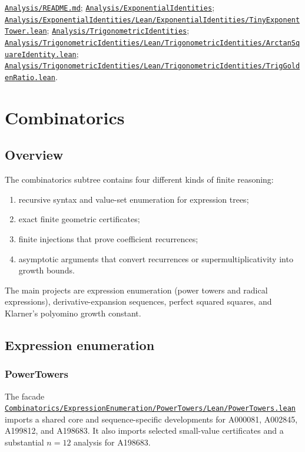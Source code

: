\documentclass[
  10pt,
  a4paper,
  twoside,
  open=any,
  parskip=half,
  headings=big
]{scrreprt}
\newcommand{\CommitFull}{675d0a2ff0fc624fba199e006049016ba806f40a}
\newcommand{\RepoBlobBase}{https://github.com/VladimirReshetnikov/ProveIt/blob/\CommitFull/}
\newcommand{\RepoTreeBase}{https://github.com/VladimirReshetnikov/ProveIt/tree/\CommitFull/}
\newcommand{\RepoFile}[1]{%
  \href{\RepoBlobBase\detokenize{#1}}{\nolinkurl{#1}}}
\newcommand{\RepoDir}[1]{%
  \href{\RepoTreeBase\detokenize{#1}}{\nolinkurl{#1}}}
\begin{document}
\begin{sourcebox}
\RepoFile{Analysis/README.md};
\RepoDir{Analysis/ExponentialIdentities};
\RepoFile{Analysis/ExponentialIdentities/Lean/ExponentialIdentities/TinyExponentTower.lean};
\RepoDir{Analysis/TrigonometricIdentities};
\RepoFile{Analysis/TrigonometricIdentities/Lean/TrigonometricIdentities/ArctanSquareIdentity.lean};
\RepoFile{Analysis/TrigonometricIdentities/Lean/TrigonometricIdentities/TrigGoldenRatio.lean}.
\end{sourcebox}

\chapter{Combinatorics}
\label{chap:combinatorics}

\section{Overview}

The combinatorics subtree contains four different kinds of finite reasoning:

\begin{enumerate}
  \item recursive syntax and value-set enumeration for expression trees;
  \item exact finite geometric certificates;
  \item finite injections that prove coefficient recurrences;
  \item asymptotic arguments that convert recurrences or
        supermultiplicativity into growth bounds.
\end{enumerate}

The main projects are expression enumeration (power towers and radical
expressions), derivative-expansion sequences, perfect squared squares, and
Klarner's polyomino growth constant.

\section{Expression enumeration}

\subsection{PowerTowers}

The facade
\RepoFile{Combinatorics/ExpressionEnumeration/PowerTowers/Lean/PowerTowers.lean}
imports a shared core and sequence-specific developments for A000081, A002845,
A199812, and A198683.  It also imports selected small-value certificates and a
substantial \(n=12\) analysis for A198683.
\end{document}
